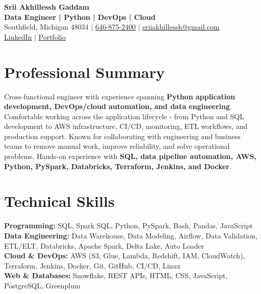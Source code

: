 \documentclass[letterpaper,10pt]{article}
\begin{document}
\fontsize{9.35pt}{10.45pt}\selectfont

\begin{center}
    {\LARGE \textbf{Srii Akhillessh Gaddam}} \\[-1pt]
    \textbf{Data Engineer | Python | DevOps | Cloud} \\[2pt]
    Southfield, Michigan 48034 $|$
    \href{tel:6468752400}{646-875-2400} $|$
    \href{mailto:sriiakhillessh@gmail.com}{sriiakhillessh@gmail.com} \\[1pt]
    \href{https://www.linkedin.com/in/srii-akhiilessh-gaddam-b48668191/}{LinkedIn} $|$
    \href{https://sriiakhillesshg.github.io/portfolio/}{Portfolio}
\end{center}
\vspace{-8pt}

\section{Professional Summary}
\small{Cross-functional engineer with experience spanning \textbf{Python application development, DevOps/cloud automation, and data engineering}. Comfortable working across the application lifecycle - from Python and SQL development to AWS infrastructure, CI/CD, monitoring, ETL workflows, and production support. Known for collaborating with engineering and business teams to remove manual work, improve reliability, and solve operational problems. Hands-on experience with \textbf{SQL, data pipeline automation, AWS, Python, PySpark, Databricks, Terraform, Jenkins, and Docker}.}

\section{Technical Skills}
\small{
\textbf{Programming:} SQL, Spark SQL, Python, PySpark, Bash, Pandas, JavaScript \\
\textbf{Data Engineering:} Data Warehouse, Data Modeling, Airflow, Data Validation, ETL/ELT, Databricks, Apache Spark, Delta Lake, Auto Loader \\
\textbf{Cloud \& DevOps:} AWS (S3, Glue, Lambda, Redshift, IAM, CloudWatch), Terraform, Jenkins, Docker, Git, GitHub, CI/CD, Linux \\
\textbf{Web \& Databases:} Snowflake, REST APIs, HTML, CSS, JavaScript, PostgreSQL, Greenplum
}
\end{document}
